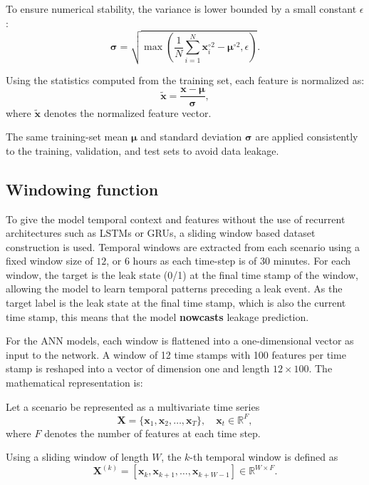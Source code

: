 \documentclass[final,5p,times,twocolumn,authoryear]{elsarticle}
\begin{document}
To ensure numerical stability, the variance is lower bounded by a small constant
$\epsilon$:
\begin{equation}
\boldsymbol{\sigma} =
\sqrt{
\max\left(
\frac{1}{N} \sum_{i=1}^{N} \mathbf{x}_i^{\circ 2}
- \boldsymbol{\mu}^{\circ 2},
\epsilon
\right)
}.
\end{equation}

Using the statistics computed from the training set, each feature is normalized
as:
\begin{equation}
\tilde{\mathbf{x}} =
\frac{\mathbf{x} - \boldsymbol{\mu}}{\boldsymbol{\sigma}},
\end{equation}
where $\tilde{\mathbf{x}}$ denotes the normalized feature vector.

The same training-set mean $\boldsymbol{\mu}$ and standard deviation
$\boldsymbol{\sigma}$ are applied consistently to the training, validation, and
test sets to avoid data leakage.

\subsection{Windowing function}

To give the model temporal context and features without the use of recurrent architectures such as LSTMs or GRUs, a sliding window based dataset construction is used. Temporal windows are extracted from each scenario using a fixed window size of $12$, or 6 hours as each time-step is of 30 minutes. For each window, the target is the leak state (0/1) at the final time stamp of the window, allowing the model to learn temporal patterns preceding a leak event. As the target label is the leak state at the final time stamp, which is also the current time stamp, this means that the model \textbf{nowcasts} leakage prediction.

For the ANN models, each window is flattened into a one-dimensional vector as input to the network. A window of 12 time stamps with 100 features per time stamp is reshaped into a vector of dimension one and length $12\times100$. The mathematical representation is:

Let a scenario be represented as a multivariate time series
\begin{equation}
\mathbf{X} = \{\mathbf{x}_1, \mathbf{x}_2, \dots, \mathbf{x}_T\},
\quad
\mathbf{x}_t \in \mathbb{R}^{F},
\end{equation}
where $F$ denotes the number of features at each time step.

Using a sliding window of length $W$, the $k$-th temporal window is defined as
\begin{equation}
\mathbf{X}^{(k)} =
\left[
\mathbf{x}_{k},
\mathbf{x}_{k+1},
\dots,
\mathbf{x}_{k+W-1}
\right]
\in \mathbb{R}^{W \times F}.
\end{equation}
\end{document}
